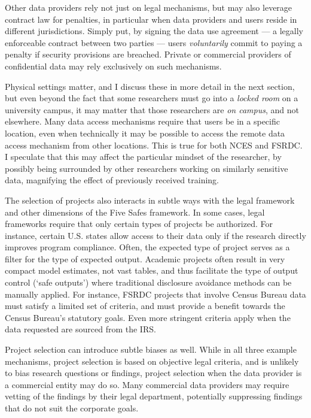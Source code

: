 Other data providers rely not just on legal mechanisms, but may also leverage contract law for penalties, in particular when data providers and users reside in different jurisdictions. Simply put, by signing the data use agreement --- a legally enforceable contract between two parties --- users \textit{voluntarily}  commit to paying a penalty if security provisions are breached. Private or commercial providers of confidential data may rely exclusively on such mechanisms. 

Physical settings matter, and I discuss these in more detail in the next section, but even beyond the fact that some researchers must go into a \textit{locked room} on a university campus, it may matter that those researchers are \textit{on campus}, and not elsewhere. Many data access mechanisms require that users be in a specific location, even when technically it may be possible to access the remote data access mechanism from other locations. This is true for both NCES and FSRDC. I speculate that this  may affect the particular mindset of the researcher, by possibly being surrounded by other researchers working on similarly sensitive data, magnifying the effect of previously received training. 

The selection of projects also interacts in subtle ways with the legal framework and other dimensions of the Five Safes framework. In some cases, legal frameworks require that only certain types of projects be authorized. For instance, certain U.S. states allow access to their data only if the research directly improves program compliance. Often, the expected type of project serves as a filter for the type of expected output. Academic projects often result in very compact model estimates, not vast tables, and thus facilitate the type of output control (`safe outputs') where traditional disclosure avoidance methods can be manually applied. For instance, FSRDC projects that involve Census Bureau data must satisfy a limited set of criteria, and must provide a benefit towards the Census Bureau's statutory goals. Even more stringent criteria apply when the data requested are sourced from the \ac{IRS}.

Project selection can introduce subtle biases as well. While in all three example mechanisms, project selection is based on objective legal criteria, and is unlikely to bias research questions or findings, project selection when the data provider is a commercial entity may do so. Many commercial data providers may require vetting of the findings by their legal department, potentially suppressing findings that do not suit the corporate goals. 

